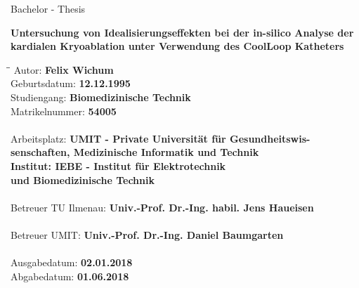 \begin{titlepage}


\vspace*{2.5 cm}
\begin{doublespace}
\begin{center}
{\Large Bachelor - Thesis} \\
\end{center}
\textbf{\LARGE Untersuchung von Idealisierungseffekten bei der in-silico Analyse der kardialen Kryoablation unter Verwendung des CoolLoop\SymbReg{} Katheters}
\end{doublespace}

\vspace*{0.5 cm}



\begin{tabbing}
\hspace*{0cm}\=\hspace*{7cm}\= \kill
 \> Autor: \>  \textbf{Felix Wichum} \\
   \> Geburtsdatum: \>  \textbf{12.12.1995} \\
    \> Studiengang: \>  \textbf{Biomedizinische Technik} \\
     \> Matrikelnummer: \>  \textbf{54005} \\ \\
      \> Arbeitsplatz: \>  \textbf{UMIT - Private Universität für Gesundheitswis-} \\
    \> \> \textbf{senschaften, Medizinische Informatik und Technik}\\
    \> \> \textbf{Institut: IEBE - Institut für Elektrotechnik}\\
    \> \> \textbf{und Biomedizinische Technik} \\ \\ 
 \> Betreuer TU Ilmenau:\>  \textbf{Univ.-Prof. Dr.-Ing. habil. Jens Haueisen} \\ \\
   \> Betreuer UMIT:\> \textbf{Univ.-Prof. Dr.-Ing. Daniel Baumgarten} \\ \\
 \> Ausgabedatum: \>  {\textbf{02.01.2018}} \\
\> Abgabedatum: \> {\textbf{01.06.2018}} 

\end{tabbing}



\end{titlepage}


